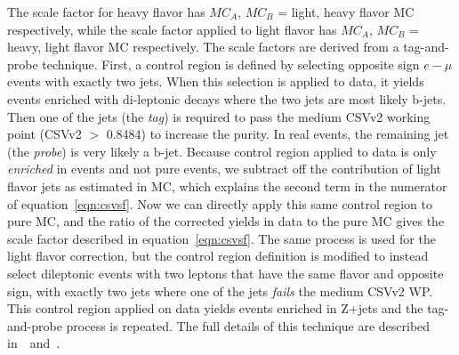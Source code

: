 \noindent The scale factor for heavy flavor has $MC_{A}$, $MC_{B}$ = light, heavy flavor MC respectively,
while the scale factor applied to light flavor has $MC_{A}$, $MC_{B}$ = heavy, light flavor MC respectively.
The scale factors are derived from a tag-and-probe technique. First,
a control region is defined by selecting opposite sign $e-\mu$ events with exactly two jets. When this selection is applied to data, it yields events enriched with di-leptonic \ttbar decays where the
two jets are most likely b-jets. Then one of the jets (the \emph{tag}) is required to pass the medium CSVv2 working point (CSVv2 $>$ 0.8484) to increase the \ttbar purity. In real \ttbar events, the
remaining jet (the \emph{probe}) is very likely a b-jet. Because control region applied to data is only \emph{enriched} in \ttbar events and not pure \ttbar events, we subtract off the contribution of
light flavor jets as estimated in MC, which explains the second term in the numerator of equation~\ref{eqn:csvsf}. Now we can directly apply this same control region to pure \ttbar MC, and the ratio
of the corrected yields in data to the pure \ttbar MC gives the scale factor described in equation~\ref{eqn:csvsf}. The same process is used for the light flavor correction, but the control region
definition is modified to instead select dileptonic events with two leptons that have the same flavor and opposite sign, with exactly two jets where one of the jets \emph{fails} the medium CSVv2 WP.
This control region applied on data yields events enriched in Z+jets and the tag-and-probe process is repeated. The full details of this technique are described in~\cite{CMS-AN-2013-130}~and~\cite{csvsf_twiki}.

